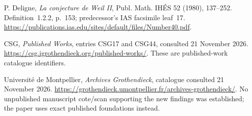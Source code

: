 P. Deligne,
\emph{La conjecture de Weil II},
Publ. Math. IH\'ES 52 (1980), 137--252.
Definition~1.2.2, p.~153; predecessor's IAS facsimile leaf~17.
\url{https://publications.ias.edu/sites/default/files/Number40.pdf}.

CSG,
\emph{Published Works}, entries CSG17 and CSG44,
consulted 21 November 2026.
\url{https://csg.igrothendieck.org/published-works/}.
These are published-work catalogue identifiers.

Universit\'e de Montpellier,
\emph{Archives Grothendieck}, catalogue consulted
21 November 2026.
\url{https://grothendieck.umontpellier.fr/archives-grothendieck/}.
No unpublished manuscript cote/scan supporting the new findings
was established; the paper uses exact published foundations instead.
